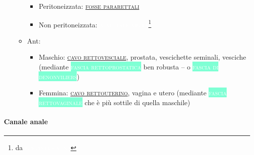 \documentclass[italian,]{article}
\providecommand{\tightlist}{%
  \setlength{\itemsep}{0pt}\setlength{\parskip}{0pt}}
\newcommand{\art}[1]{\colorbox{RedOrange}{\textcolor{white}{\textsc{#1}}}}
\newcommand{\tol}[1]{\colorbox{Aquamarine}{\textcolor{white}{\textsc{#1}}}}
\renewcommand{\a}[1]{\underline{\textsc{#1}}}
\begin{document}
\begin{itemize}
\begin{itemize}
    \begin{itemize}
    \tightlist
    \item
      Peritoneizzata: \a{fosse pararettali}
    \item
      Non peritoneizzata: \art{a rettale media}\footnote{da
        \art{epigastrica inf}}
    \end{itemize}
  \item
    Ant:

    \begin{itemize}
    \tightlist
    \item
      Maschio: \a{cavo rettovesciale}, prostata, vescichette seminali,
      vesciche (mediante \tol{fascia rettoprostatica} ben robusta -- o
      \tol{fascia di denonviliers})
    \item
      Femmina: \a{cavo rettouterino}, vagina e utero (mediante
      \tol{fascia rettovaginale} che è più sottile di quella maschile)
    \end{itemize}
  \end{itemize}
\end{itemize}

\hypertarget{canale-anale}{%
\paragraph{Canale anale}\label{canale-anale}}
\end{document}
